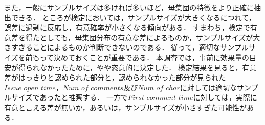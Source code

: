 また，一般にサンプルサイズは多ければ多いほど，母集団の特徴をより正確に抽出できる．
ところが検定においては，サンプルサイズが大きくなるにつれて，誤差に過剰に反応し，有意確率が小さくなる傾向がある．
すまわち，検定で有意差を得たとしても，母集団分布の有意な差によるものか，サンプルサイズが大きすぎることによるものか判断できないのである．
従って，適切なサンプルサイズを前もって決めておくことが重要である．
本調査では，事前に効果量の目安が得られなかったために，やや恣意的に決定した．
検定結果を見ると，有意差がはっきりと認められた部分と，認められなかった部分が見られた$Issue\_open\_time$，$Num\_of\_comments$及び$Num\_of\_char$に対しては適切なサンプルサイズであったと推察する．
一方で$First\_comment\_time$に対しては，実際に有意と言える差が無いか，あるいは，サンプルサイズが小さすぎた可能性がある．
